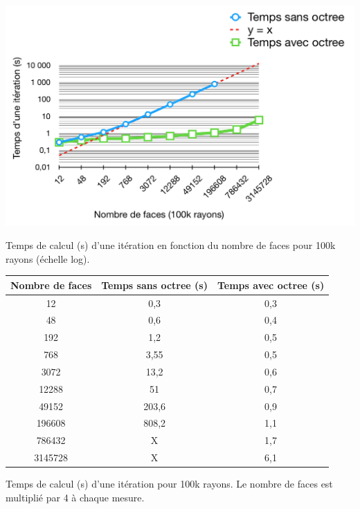  \begin{figureth}
	\includegraphics[width=\linewidth]{images/complexite1}
	\caption{Temps de calcul (s) d'une itération en fonction du nombre de faces pour 100k rayons (échelle log).}
	\label{complexite1}
\end{figureth}

\begin{tableth}
	\begin{tabular}{| c | c | c |}
			\hline
		Nombre de faces & Temps \textbf{sans} \gls{octree} (s) & Temps \textbf{avec} \gls{octree} (s)\\
		  \hline
		  \hline
		   12 &0,3&	0,3 \\
		   \hline
		48 &0,6	&0,4 \\
		   \hline
		192 & 1,2	&0,5\\
		   \hline
		768 & 3,55&	0,5\\
		   \hline
		3072 & 13,2	&0,6\\
		   \hline
		12288 &51	&0,7 \\
		     \hline
		     49152 & 203,6	&0,9\\
		   \hline
		196608 & 808,2	&1,1\\
		\hline
		786432 & X & 1,7 \\
		\hline
		3145728 & X & 6,1 \\
		\hline
	 \end{tabular}
	\caption{Temps de calcul (s) d'une itération pour 100k rayons. Le nombre de faces est multiplié par 4 à chaque mesure.}
	\label{tabComplexite1}
\end{tableth}

\clearpage

